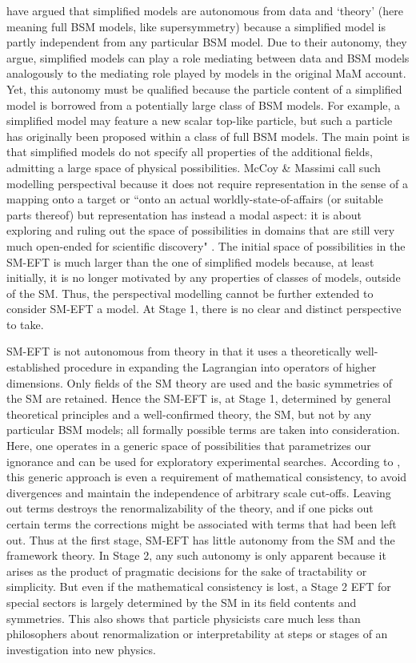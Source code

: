 \citet{mccoymassimi} have argued that simplified models are autonomous from data and `theory' (here meaning full BSM models, like supersymmetry) because a simplified model is partly independent from any particular BSM model. 
Due to their autonomy, they argue, simplified models can play a role mediating between data and BSM models analogously to the mediating role played by models in the original MaM account. 
Yet, this autonomy must be qualified because the particle content of a simplified model is borrowed from a potentially large class of BSM models. 
For example, a simplified model may feature a new scalar top-like particle, but such a particle has originally been proposed within a class of full BSM models. 
The main point is that simplified models do not specify all properties of the additional fields, admitting a large space of physical possibilities.
McCoy \& Massimi call such modelling perspectival because it does not require representation in the sense of a mapping onto a target or ``onto an actual worldly-state-of-affairs (or suitable parts thereof) but representation has instead a modal aspect: it is about exploring and ruling out the space of possibilities in domains that are still very much open-ended for scientific discovery" \citep[p.~338]{mccoymassimi}.
The initial space of possibilities in the SM-EFT is much larger than the one of simplified models because, at least initially, it is no longer motivated by any properties of classes of models, outside of the SM. 
Thus, the perspectival modelling cannot be further extended to consider SM-EFT a model.
At Stage 1, there is no clear and distinct perspective to take. 

SM-EFT is not autonomous from theory in that it uses a theoretically well-established procedure in expanding the Lagrangian into operators of higher dimensions. 
Only fields of the SM theory are used and the basic symmetries of the SM are retained. 
Hence the SM-EFT is, at Stage 1, determined by general theoretical principles and a well-confirmed theory, the SM, but not by any particular BSM models; all formally possible terms are taken into consideration.  
Here, one operates in a generic space of possibilities that parametrizes our ignorance and can be used for exploratory experimental searches. 
According to \cite{wells2011}, this generic approach is even a requirement of mathematical consistency, to avoid divergences and maintain the independence of arbitrary scale cut-offs. 
Leaving out terms destroys the renormalizability of the theory, and if one picks out certain terms the corrections might be associated with terms that had been left out. 
Thus at the first stage, SM-EFT has little autonomy from the SM and the framework theory. 
In Stage 2, any such autonomy is only apparent because it arises as the product of pragmatic decisions for the sake of tractability or simplicity.
But even if the mathematical consistency is lost, a Stage 2 EFT for special sectors is largely determined by the SM in its field contents and symmetries. This also shows that particle physicists care much less than philosophers about renormalization or interpretability at steps or stages of an investigation into new physics.


